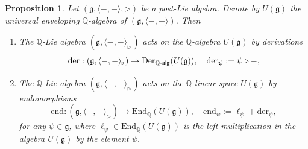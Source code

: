 \documentclass[11pt, a4paper]{amsart}
\newtheorem{proposition}[theorem]{Proposition}
\numberwithin{equation}{section}
\theoremstyle{definition}
\newcommand{\Q}{\mathbb{Q}}
\begin{document}
\begin{proposition} \label{prop:generic_act_end}
Let $(\mathfrak{g}, \langle-,-\rangle,\triangleright)$ be a post-Lie algebra. Denote by $U(\mathfrak{g})$ the universal enveloping $\Q$-algebra of $(\mathfrak{g}, \langle-,-\rangle)$. 
Then
\begin{enumerate}[label=(\alph*), leftmargin=*]
\item \label{generic_act_der} The $\Q$-Lie algebra $(\mathfrak{g}, \langle-,-\rangle_\triangleright)$ acts on the $\Q$-algebra $U(\mathfrak{g})$ by derivations
\[
\mathrm{der} : (\mathfrak{g}, \langle-,-\rangle_\triangleright) \to \mathrm{Der}_{\Q{\text-}\mathsf{alg}}(U(\mathfrak{g})), \quad \mathrm{der}_\psi := \psi \triangleright -,
\]
\item \label{generic_act_end} The $\Q$-Lie algebra $(\mathfrak{g}, \langle-,-\rangle_\triangleright)$ acts on the $\Q$-linear space $U(\mathfrak{g})$ by endomorphisms
\[
\mathrm{end} : (\mathfrak{g}, \langle-,-\rangle_\triangleright) \to \mathrm{End}_\Q(U(\mathfrak{g})), \quad \mathrm{end}_\psi := \ell_\psi + \mathrm{der}_\psi, 
\]
for any $\psi \in \mathfrak{g}$, where $\ell_\psi \in \mathrm{End}_\Q(U(\mathfrak{g}))$ is the left multiplication in the algebra $U(\mathfrak{g})$ by the element $\psi$. 
\end{enumerate}
\end{proposition}
\end{document}
